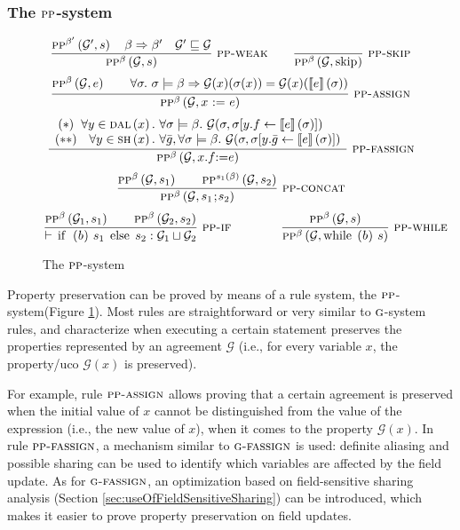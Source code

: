\documentclass[prodmode,acmtocl]{acmsmall}
\def\state{\ensuremath{\sigma}\xspace}
\def\ok#1{\mbox{\raisebox{0ex}[1ex][1ex]{$#1$}}}
\newcommand{\0}{\mbox{\bf 0}}
\def\ok#1{\mbox{\raisebox{0ex}[1ex][1ex]{$#1$}}}
\newcommand{\UNARYFUNCTION}[2]{#1\ifthenelse{\equal{#2}{}}{}{\left(#2\right)}}
\newcommand{\CODE}[1]{\ensuremath{\mbox{\lstinline!#1!}\xspace}\xspace}
\newcommand{\SEMANTICS}[1]{\left\llbracket #1 \right\rrbracket}
\newcommand{\IMPASSIGN}[2]{#1\ \CODE{:=}\ #2}
\newcommand{\IMPIF}[3]{\CODE{if (}#1\CODE{)}~#2~\CODE{else}~#3}
\newcommand{\IMPWHILE}[2]{\CODE{while (}#1\CODE{)}~#2}
\newcommand{\EVAL}[2]{\ok{\UNARYFUNCTION{\SEMANTICS{#1}}{#2}}}
\def\PRED{\beta}
\def\AGREEM{\mathcal{G}}
\newcommand{\RULENAME}[1]{\textsc{#1}}
\newcommand{\GRULENAME}[1]{\textsc{g-#1}}
\newcommand{\PRULENAME}[1]{\textsc{pp-#1}}
\newcommand{\PRULE}[3]{\frac{#1}{#2}\ \PRULENAME{#3}}
\newcommand{\PSMTH}[1]{$\RULENAME{pp}$-#1}
\def\PSYSTEM{\PSMTH{system}\xspace}
\newcommand{\GSMTH}[1]{$\RULENAME{g}$-#1}
\def\GSYSTEM{\GSMTH{system}\xspace}
\newcommand{\PRESERVESB}[3]{\textsc{pp}^{#1}\left(#3,#2\right)}
\newcommand{\PRES}[2]{\vdash #1 : #2}
\newcommand{\SHARE}[1]{\textsc{sh}\left(#1\right)}
\newcommand{\DALIAS}[1]{\textsc{dal}\left(#1\right)}
\begin{document}
\subsubsection{The \PSYSTEM}
\label{sec:thePSystem}

\begin{figure}
  \begin{center}
    \[ \PRULE{\PRESERVESB{\PRED'}{s}{\AGREEM'} \quad \PRED\Rightarrow
      \PRED' \quad \AGREEM' \sqsubseteq
      \AGREEM}{\PRESERVESB{\PRED}{s}{\AGREEM}}{weak} \qquad
    \PRULE{}{\PRESERVESB{\PRED}{\mbox{\CODE{skip}}}{\AGREEM}}{skip} \]
\[ \PRULE{\PRESERVESB{\PRED}{e}{\AGREEM} \qquad \forall
      \state.~\state \models \PRED \Rightarrow \AGREEM(x)(\state(x))
      = \AGREEM(x)(\EVAL{e}{\state})}
       {\PRESERVESB{\PRED}{\mbox{\IMPASSIGN{$x$}{$e$}}}{\AGREEM}}{assign} \]
       \[ \PRULE{
         \begin{array}{c@{~}r@{~}l}
           ({*}) & \forall y \in \DALIAS{x}. & \forall \state
           \models \PRED.~\AGREEM(\state,\state[y.f \leftarrow
             \SEMANTICS{e}(\state)]) \\
           ({*}{*}) & \forall y \in \SHARE{x}. &
           \forall \bar{g}, \forall
           \state \models \PRED.~\AGREEM(\state,\state[y.\bar{g}
             \leftarrow \SEMANTICS{e}(\state)])
       \end{array}}{\PRESERVESB{\PRED}{x.f\mbox{\CODE{:=}}e}{\AGREEM}}{fassign}
       \]
       \[ \PRULE{\PRESERVESB{\PRED}{s_1}{\AGREEM} \qquad
         \PRESERVESB{s_1(\PRED)}{s_2}{\AGREEM}}
          {\PRESERVESB{\PRED}{s_1\mbox{\CODE{;}}s_2}{\AGREEM}}{concat} \]
          \[ \PRULE{\PRESERVESB{\PRED}{s_1}{\AGREEM_1} \qquad \PRESERVESB{\PRED}{s_2}{\AGREEM_2}}
             {\PRES{\mbox{\IMPIF{$b$}{$s_1$}{$s_2$}}}{\AGREEM_1 \sqcup \AGREEM_2}}{if} \qquad
             \qquad
             \PRULE{\PRESERVESB{\PRED}{s}{\AGREEM}}{\PRESERVESB{\PRED}{\mbox{\IMPWHILE{$b$}{$s$}}}{\AGREEM}}{while} \]
  \end{center}
  \caption{The \PSYSTEM}
  \label{fig:thePSystem}
\end{figure}


Property preservation can be proved by means of a rule system, the
\PSYSTEM (Figure \ref{fig:thePSystem}).  Most rules are
straightforward or very similar to \GSYSTEM rules, and characterize
when executing a certain statement preserves the properties
represented by an agreement $\AGREEM$ (i.e., for every variable $x$,
the property/uco $\AGREEM(x)$ is preserved).

For example, rule $\PRULENAME{assign}$ allows proving that a certain
agreement is preserved when the initial value of $x$ cannot be
distinguished from the value of the expression (i.e., the new value of
$x$), when it comes to the property $\AGREEM(x)$.  In rule
$\PRULENAME{fassign}$, a mechanism similar to $\GRULENAME{fassign}$ is
used: definite aliasing and possible sharing can be used to identify
which variables are affected by the field update.  As for
$\GRULENAME{fassign}$, an optimization based on field-sensitive
sharing analysis (Section \ref{sec:useOfFieldSensitiveSharing}) can be
introduced, which makes it easier to prove property preservation on
field updates.
\end{document}
